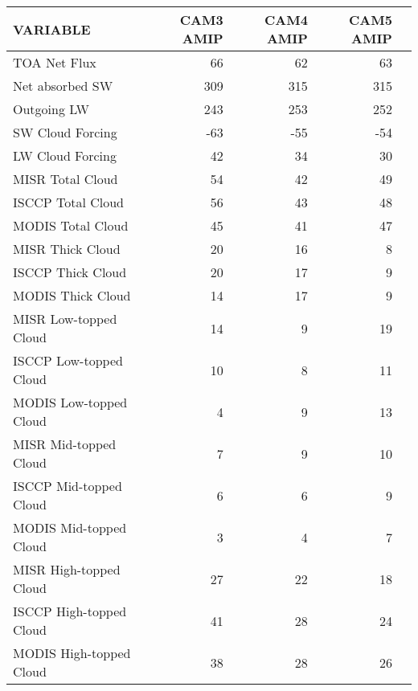 \begin{tabular}{lrrrr}
\hline
                VARIABLE &                CAM3 AMIP &                CAM4 AMIP &                CAM5 AMIP \\ \hline
            TOA Net Flux &                       66 &                       62 &                       63 \\
         Net absorbed SW &                      309 &                      315 &                      315 \\
             Outgoing LW &                      243 &                      253 &                      252 \\
        SW Cloud Forcing &                      -63 &                      -55 &                      -54 \\
        LW Cloud Forcing &                       42 &                       34 &                       30 \\
        MISR Total Cloud &                       54 &                       42 &                       49 \\
       ISCCP Total Cloud &                       56 &                       43 &                       48 \\
       MODIS Total Cloud &                       45 &                       41 &                       47 \\
        MISR Thick Cloud &                       20 &                       16 &                        8 \\
       ISCCP Thick Cloud &                       20 &                       17 &                        9 \\
       MODIS Thick Cloud &                       14 &                       17 &                        9 \\
   MISR Low-topped Cloud &                       14 &                        9 &                       19 \\
  ISCCP Low-topped Cloud &                       10 &                        8 &                       11 \\
  MODIS Low-topped Cloud &                        4 &                        9 &                       13 \\
   MISR Mid-topped Cloud &                        7 &                        9 &                       10 \\
  ISCCP Mid-topped Cloud &                        6 &                        6 &                        9 \\
  MODIS Mid-topped Cloud &                        3 &                        4 &                        7 \\
  MISR High-topped Cloud &                       27 &                       22 &                       18 \\
 ISCCP High-topped Cloud &                       41 &                       28 &                       24 \\
 MODIS High-topped Cloud &                       38 &                       28 &                       26 \\ \hline
\end{tabular}
